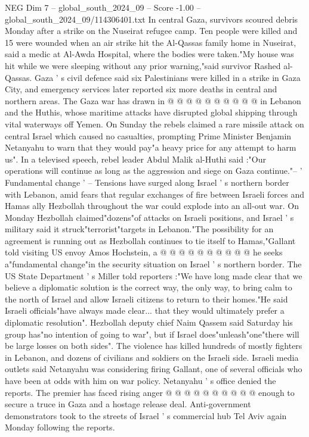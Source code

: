 \begin{textsample}{NEG Dim 7 – global\_south\_2024\_09 – Score -1.00 – global\_south\_2024\_09/114306401.txt}
In central Gaza, survivors scoured debris Monday after a strike on the Nuseirat refugee camp.
Ten people were killed and 15 were wounded when an air strike hit the Al-Qassas family home in Nuseirat, said a medic at Al-Awda Hospital, where the bodies were taken."My house was hit while we were sleeping without any prior warning,"said survivor Rashed al-Qassas.
Gaza ' s civil defence said six Palestinians were killed in a strike in Gaza City, and emergency services later reported six more deaths in central and northern areas.
The Gaza war has drawn in @ @ @ @ @ @ @ @ @ @ in Lebanon and the Huthis, whose maritime attacks have disrupted global shipping through vital waterways off Yemen.
On Sunday the rebels claimed a rare missile attack on central Israel which caused no casualties, prompting Prime Minister Benjamin Netanyahu to warn that they would pay"a heavy price for any attempt to harm us".
In a televised speech, rebel leader Abdul Malik al-Huthi said :"Our operations will continue as long as the aggression and siege on Gaza continue."-- ' Fundamental change ' -- Tensions have surged along Israel ' s northern border with Lebanon, amid fears that regular exchanges of fire between Israeli forces and Hamas ally Hezbollah throughout the war could explode into an all-out war.
On Monday Hezbollah claimed"dozens"of attacks on Israeli positions, and Israel ' s military said it struck"terrorist"targets in Lebanon."The possibility for an agreement is running out as Hezbollah continues to tie itself to Hamas,"Gallant told visiting US envoy Amos Hochstein, a @ @ @ @ @ @ @ @ @ @ he seeks a"fundamental change"in the security situation on Israel ' s northern border.
The US State Department ' s Miller told reporters :"We have long made clear that we believe a diplomatic solution is the correct way, the only way, to bring calm to the north of Israel and allow Israeli citizens to return to their homes."He said Israeli officials"have always made clear... that they would ultimately prefer a diplomatic resolution".
Hezbollah deputy chief Naim Qassem said Saturday his group has"no intention of going to war", but if Israel does"unleash"one"there will be large losses on both sides".
The violence has killed hundreds of mostly fighters in Lebanon, and dozens of civilians and soldiers on the Israeli side.
Israeli media outlets said Netanyahu was considering firing Gallant, one of several officials who have been at odds with him on war policy.
Netanyahu ' s office denied the reports.
The premier has faced rising anger @ @ @ @ @ @ @ @ @ @ enough to secure a truce in Gaza and a hostage release deal.
Anti-government demonstrators took to the streets of Israel ' s commercial hub Tel Aviv again Monday following the reports.

\end{textsample}

